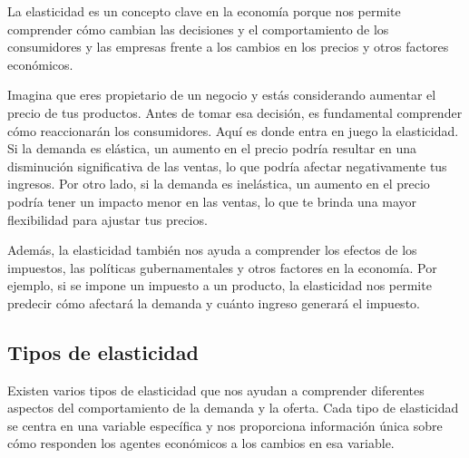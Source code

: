\documentclass[
  a4paper,
]{article}
\begin{document}
La elasticidad es un concepto clave en la economía porque nos permite
comprender cómo cambian las decisiones y el comportamiento de los
consumidores y las empresas frente a los cambios en los precios y otros
factores económicos.

Imagina que eres propietario de un negocio y estás considerando aumentar
el precio de tus productos. Antes de tomar esa decisión, es fundamental
comprender cómo reaccionarán los consumidores. Aquí es donde entra en
juego la elasticidad. Si la demanda es elástica, un aumento en el precio
podría resultar en una disminución significativa de las ventas, lo que
podría afectar negativamente tus ingresos. Por otro lado, si la demanda
es inelástica, un aumento en el precio podría tener un impacto menor en
las ventas, lo que te brinda una mayor flexibilidad para ajustar tus
precios.

Además, la elasticidad también nos ayuda a comprender los efectos de los
impuestos, las políticas gubernamentales y otros factores en la
economía. Por ejemplo, si se impone un impuesto a un producto, la
elasticidad nos permite predecir cómo afectará la demanda y cuánto
ingreso generará el impuesto.

\hypertarget{tipos-de-elasticidad}{%
\subsection{Tipos de elasticidad}\label{tipos-de-elasticidad}}

Existen varios tipos de elasticidad que nos ayudan a comprender
diferentes aspectos del comportamiento de la demanda y la oferta. Cada
tipo de elasticidad se centra en una variable específica y nos
proporciona información única sobre cómo responden los agentes
económicos a los cambios en esa variable.
\end{document}
